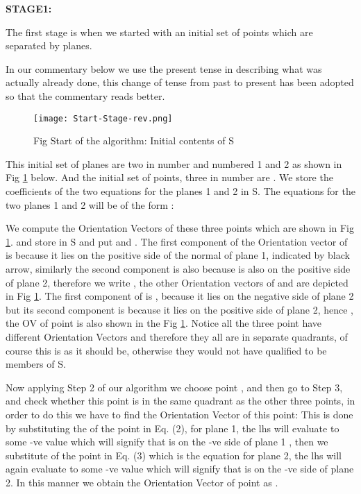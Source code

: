 \documentclass[english]{article}
\begin{document}
\medskip{}


\textbf{STAGE1:}

The first stage is when we started with an initial set of points which
are separated by planes.

In our commentary below we use the present tense in describing what
was actually already done, this change of tense from past to present
has been adopted so that the commentary reads better. 

\medskip{}
\begin{figure}[htp]
 \begin{center}
 
\texttt{[image: Start-Stage-rev.png]}
\caption{Fig Start of the algorithm: Initial contents of S}

\label{fig:fig-i} \end{center}
\end{figure} 

This initial set of planes are two in number and numbered 1 and 2
as shown in Fig \ref{fig:fig-i}
below. And the initial set of points, three in number are
. We store the coefficients of the two equations
for the planes 1 and 2 in S. The equations for the two planes 1 and
2 will be of the form :





We compute the Orientation Vectors of these three points which are
shown in Fig \ref{fig:fig-i}. and store in S and put  and .
The first component of the Orientation vector of  is  because it lies on the positive side of the normal of plane 1, indicated by black arrow, similarly the second component is also  because  is also on the positive side of plane 2, therefore we write , the other Orientation vectors of  and  are depicted in Fig \ref{fig:fig-i}. The first component of  is , because it lies on the negative side of plane 2 but its second component is  because it lies on the positive side of plane 2, hence , the OV of point  is also shown in the Fig \ref{fig:fig-i}.
Notice all the three point have different Orientation Vectors and therefore they all are in separate quadrants, of course this is as it should be, otherwise they would not have qualified to be members of S. 
 
Now applying
Step 2 of our algorithm we choose point , and then go to Step
3, and check whether this point is in the same quadrant as the other
three points, in order to do this we have to find the Orientation
Vector of this point: This is done by substituting the  of
the point  in Eq. (2), for plane 1, the lhs will evaluate
to some -ve value which will signify that  is on the -ve side
of plane 1 , then we substitute  of the point  in
Eq. (3) which is the equation for plane 2, the lhs will again evaluate
to some -ve value which will signify that  is on the -ve side
of plane 2. In this manner we obtain the Orientation Vector  of point 
as . 
\end{document}

